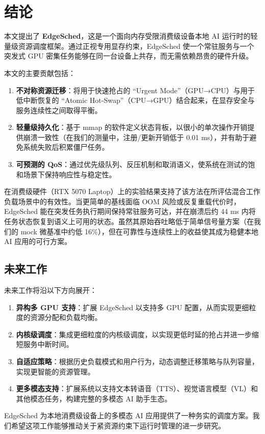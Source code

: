 \section{结论}

本文提出了 \textbf{EdgeSched}，这是一个面向内存受限消费级设备本地 AI 运行时的轻量级资源调度框架。通过正视专用显存约束，EdgeSched 使一个常驻服务与一个突发式 GPU 密集任务能够在同一台设备上共存，而无需依赖昂贵的硬件升级。

本文的主要贡献包括：
\begin{enumerate}
\item \textbf{不对称资源迁移}：将用于快速抢占的 ``Urgent Mode''（GPU→CPU）与用于低中断恢复的 ``Atomic Hot-Swap''（CPU→GPU）结合起来，在显存安全与服务连续性之间取得平衡。

\item \textbf{轻量级持久化}：基于 mmap 的软件定义状态背板，以很小的单次操作开销提供崩溃一致性（在我们的测量中，注册/更新开销低于 0.01 ms），并有助于避免系统失败后积累僵尸任务。

\item \textbf{可预测的 QoS}：通过优先级队列、反压机制和取消语义，使系统在测试的饱和场景下保持响应性与稳定性。
\end{enumerate}

在消费级硬件（RTX 5070 Laptop）上的实验结果支持了该方法在所评估混合工作负载场景中的有效性。当更简单的基线面临 OOM 风险或反复重载代价时，EdgeSched 能在突发任务执行期间保持常驻服务可达，并在崩溃后约 44 ms 内将任务状态恢复到语义上可用的状态。虽然其原始吞吐略低于简单信号量方案（在我们的 mock 微基准中约低 16\%），但在可靠性与连续性上的收益使其成为稳健本地 AI 应用的可行方案。

\subsection{未来工作}

未来工作将沿以下方向展开：

\begin{enumerate}
\item \textbf{异构多 GPU 支持}：扩展 EdgeSched 以支持多 GPU 配置，从而实现更细粒度的资源分配和负载均衡。

\item \textbf{内核级调度}：集成更细粒度的内核级调度，以实现更低时延的抢占并进一步缩短服务中断时间。

\item \textbf{自适应策略}：根据历史负载模式和用户行为，动态调整迁移策略与队列容量，实现更智能的资源管理。

\item \textbf{更多模态支持}：扩展系统以支持文本转语音（TTS）、视觉语言模型（VL）和其他模态任务，构建完整的多模态 AI 助手生态。
\end{enumerate}

EdgeSched 为本地消费级设备上的多模态 AI 应用提供了一种务实的调度方案。我们希望这项工作能够推动关于紧资源约束下运行时管理的进一步研究。